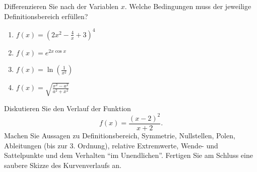 \begin{ejercicio}
    Differenzieren Sie nach der Variablen $x$. Welche Bedingungen muss der jeweilige Definitionsbereich erfüllen?
    \begin{enumerate}
        \item $f(x) = \left(2x^2 - \frac{4}{x} + 3\right)^4$
        \item $f(x) = e^{2x \cos x}$
        \item $f(x) = \ln\left(\frac{1}{x^2}\right)$
        \item $f(x) = \sqrt{\frac{x^2 - a^2}{a^2 + x^2}}$
    \end{enumerate}
\end{ejercicio}

\begin{ejercicio}[Kurvendiskussion]
    Diskutieren Sie den Verlauf der Funktion
    \[
        f(x) = \frac{(x - 2)^2}{x + 2}.
    \]
    Machen Sie Aussagen zu Definitionsbereich, Symmetrie, Nullstellen, Polen, Ableitungen (bis zur 3. Ordnung), relative Extremwerte, Wende- und Sattelpunkte und dem Verhalten ``im Unendlichen''. Fertigen Sie am Schluss eine saubere Skizze des Kurvenverlaufs an.
\end{ejercicio}